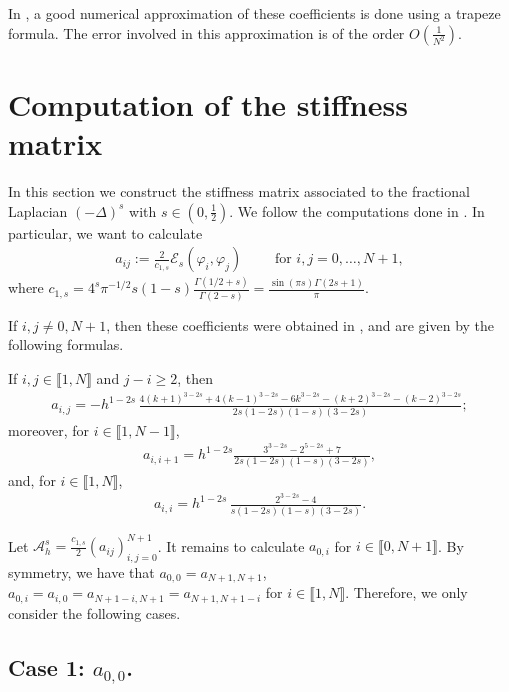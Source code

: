 \documentclass[11 pt]{article}
\newcommand\inter[1]{\llbracket #1\rrbracket}
\numberwithin{equation}{section}
\def\cE{\mathcal{E}}
\begin{document}
In \cite{L22}, a good numerical approximation of these coefficients is done using a trapeze formula.  The error involved in this approximation is of the order $O(\frac{1}{N^2})$.  








\section{Computation of the stiffness matrix}\label{sec:s:m}

In this section we construct the stiffness matrix associated to the fractional Laplacian $(-\Delta)^s$ with $s\in(0,\frac{1}{2})$. We follow the computations done in \cite{BH17}.  In particular, we want to calculate
\begin{align*}
a_{ij}:=\frac{2}{c_{1,s}}\cE_s(\varphi_i,\varphi_j)\qquad \text{ for }i,j=0,\ldots, N+1,
\end{align*}
where $c_{1,s}=4^s\pi^{-1/2}s(1-s)\frac{\Gamma(1/2+s)}{\Gamma(2-s)}=\frac{\sin (\pi  s) \Gamma (2 s+1)}{\pi }$.

If $i,j\neq 0,N+1$, then these coefficients were obtained in \cite{BH17}, and are given by the following formulas. 

If $i,j\in\inter{1,N}$ and $j-i\geq 2$, then
\begin{align*}
	a_{i,j} = - h^{1-2s}\,\frac{4(k+1)^{3-2s} + 4(k-1)^{3-2s}-6k^{3-2s}-(k+2)^{3-2s}-(k-2)^{3-2s}}{2s(1-2s)(1-s)(3-2s)};
\end{align*} 
moreover, for $i\in\inter{1,N-1}$,
\begin{align*}
	a_{i,i+1} =	\displaystyle h^{1-2s}\frac{3^{3-2s}-2^{5-2s}+7}{2s(1-2s)(1-s)(3-2s)},
\end{align*}
and, for  $i\in\inter{1,N}$,
\begin{align*}
	a_{i,i} =
			\displaystyle h^{1-2s}\,\frac{2^{3-2s}-4}{s(1-2s)(1-s)(3-2s)}.
\end{align*}

Let $\mathcal A^s_h=\frac{c_{1,s}}{2}(a_{ij})_{i,j=0}^{N+1}$. It remains to calculate $a_{0,i}$ for $i\in\inter{0,N+1}$.  By symmetry, we have that $a_{0,0}=a_{N+1,N+1}$, $a_{0,i}=a_{i,0}=a_{N+1-i,N+1}=a_{N+1,N+1-i}$ for $i\in\inter{1,N}$. Therefore, we only consider the following cases.

\subsection{Case 1: $a_{0,0}$.}
\end{document}
